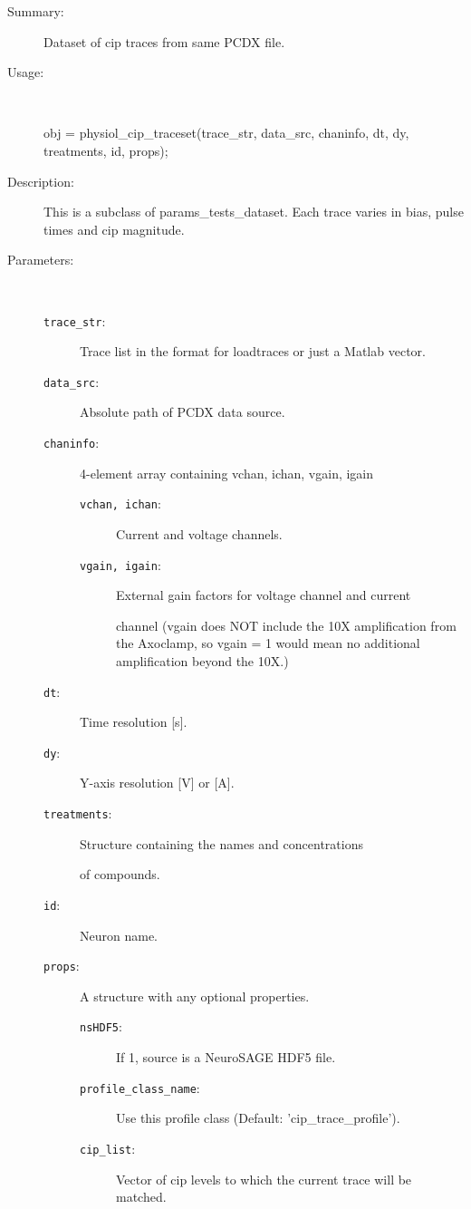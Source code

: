 \begin{description}
\item[Summary:]Dataset of cip traces from same PCDX file.
%
\item[Usage:]~%
\begin{lyxcode}%
obj = physiol\_cip\_traceset(trace\_str, data\_src, chaninfo, dt, dy, treatments, id, props);
%
\end{lyxcode}%
%
\item[Description:]%
This is a subclass of params\_tests\_dataset. Each trace varies in bias, 
 pulse times and cip magnitude.
\item[Parameters:]~
\begin{description}%
\item[\texttt{trace\_str}:]
 Trace list in the format for loadtraces or just a Matlab vector.
\item[\texttt{data\_src}:]
 Absolute path of PCDX data source.
\item[\texttt{chaninfo}:]
 4-element array containing vchan, ichan, vgain, igain
\begin{description}%
\item[\texttt{vchan, ichan}:]
 Current and voltage channels.
\item[\texttt{vgain, igain}:]
 External gain factors for voltage channel and current 

channel
(vgain does NOT include the 10X amplification from the Axoclamp,
so vgain = 1 would mean no additional amplification beyond the 10X.)\end{description}%
\item[\texttt{dt}:]
 Time resolution [s].
\item[\texttt{dy}:]
 Y-axis resolution [V] or [A].
\item[\texttt{treatments}:]
 Structure containing the names and concentrations

of compounds.\item[\texttt{id}:]
 Neuron name.
\item[\texttt{props}:]
 A structure with any optional properties.
\begin{description}%
\item[\texttt{nsHDF5}:]
 If 1, source is a NeuroSAGE HDF5 file.
\item[\texttt{profile\_class\_name}:]
 Use this profile class (Default: 'cip\_trace\_profile').
\item[\texttt{cip\_list}:]
 Vector of cip levels to which the current trace will be matched.


\end{description}
\end{description}
\end{description}
